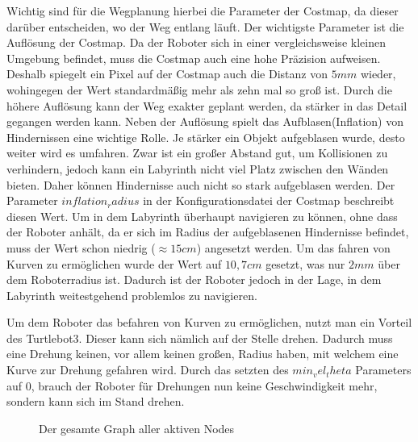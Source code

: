 {{			
			Wichtig sind für die Wegplanung hierbei die Parameter der Costmap, da dieser darüber entscheiden, wo der Weg entlang läuft. Der wichtigste Parameter ist die Auflösung der Costmap. Da der Roboter sich in einer vergleichsweise kleinen Umgebung befindet, muss die Costmap auch eine hohe Präzision aufweisen. Deshalb spiegelt ein Pixel auf der Costmap auch die Distanz von $5 \si{mm}$ wieder, wohingegen der Wert standardmäßig mehr als zehn mal so groß ist. Durch die höhere Auflösung kann der Weg exakter geplant werden, da stärker in das Detail gegangen werden kann. Neben der Auflösung spielt das Aufblasen(Inflation) von Hindernissen eine wichtige Rolle. Je stärker ein Objekt aufgeblasen wurde, desto weiter wird es umfahren. Zwar ist ein großer Abstand gut, um Kollisionen zu verhindern, jedoch kann ein Labyrinth nicht viel Platz zwischen den Wänden bieten. Daher können Hindernisse auch nicht so stark aufgeblasen werden. Der Parameter $inflation_radius$ in der Konfigurationsdatei der Costmap beschreibt diesen Wert. Um in dem Labyrinth überhaupt navigieren zu können, ohne dass der Roboter anhält, da er sich im Radius der aufgeblasenen Hindernisse befindet, muss der Wert schon niedrig ($\approx 15\si{cm}$) angesetzt werden. Um das fahren von Kurven zu ermöglichen wurde der Wert auf $10,7 \si{cm}$ gesetzt, was nur $2 \si{mm}$ über dem Roboterradius ist. Dadurch ist der Roboter jedoch in der Lage, in dem Labyrinth weitestgehend problemlos zu navigieren.
			
			Um dem Roboter das befahren von Kurven zu ermöglichen, nutzt man ein Vorteil des Turtlebot3. Dieser kann sich nämlich auf der Stelle drehen. Dadurch muss eine Drehung keinen, vor allem keinen großen, Radius haben, mit welchem eine Kurve zur Drehung gefahren wird. Durch das setzten des $min_vel_theta$ Parameters auf $0$, brauch der Roboter für Drehungen nun keine Geschwindigkeit mehr, sondern kann sich im Stand drehen.
			
			\begin{landscape}
				\begin{figure}[htbp]
					\centering
					\caption[short]{Der gesamte Graph aller aktiven Nodes}
					\label{pic:rosgfullfront}
				\end{figure}
			\end{landscape}

			
			
		}
}	